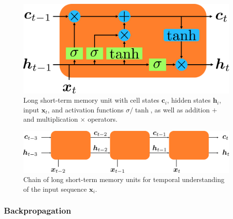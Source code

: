\cite{hochreiter1997long} %
\begin{figure}[h]
	\centering
	\includegraphics[scale=.28]{chapters/03_background/img/lstm.png}
	\caption{Long short-term memory unit with cell states $\bm{c}_i$, hidden states $\bm{h}_i$, input $\bm{x}_t$, and activation functions $\sigma/\tanh$, as well as addition $+$ and multiplication $\times$ operators.}
	\label{fig::321_lstm}
\end{figure}
\begin{figure}[h]
	\centering
	\includegraphics[scale=.28]{chapters/03_background/img/lstm_chain.png}
	\caption{Chain of long short-term memory units for temporal understanding of the input sequence $\bm{x}_i$.}
	\label{fig::321_lstm_chain}
\end{figure}
\subsubsection{Backpropagation}
\cite{linnainmaa1970representation}